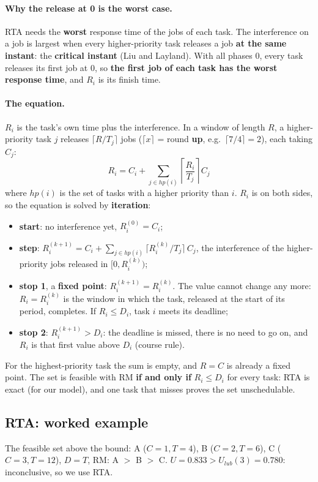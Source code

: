 \paragraph{Why the release at 0 is the worst case.} RTA needs the \textbf{worst} response time of the jobs of each task. The interference on a job is largest when every higher-priority task releases a job \textbf{at the same instant}: the \textbf{critical instant} (Liu and Layland). With all phases 0, every task releases its first job at 0, so \textbf{the first job of each task has the worst response time}, and $R_i$ is its finish time.

\paragraph{The equation.} $R_i$ is the task's own time plus the interference. In a window of length $R$, a higher-priority task $j$ releases $\lceil R / T_j \rceil$ jobs ($\lceil x \rceil$ = round \textbf{up}, e.g.\ $\lceil 7/4 \rceil = 2$), each taking $C_j$:
\[
R_i = C_i + \sum_{j \in hp(i)} \left\lceil \frac{R_i}{T_j} \right\rceil C_j
\]
where $hp(i)$ is the set of tasks with a higher priority than $i$. $R_i$ is on both sides, so the equation is solved by \textbf{iteration}:
\begin{itemize}
    \item \textbf{start}: no interference yet, $R_i^{(0)} = C_i$;
    \item \textbf{step}: $R_i^{(k+1)} = C_i + \sum_{j \in hp(i)} \lceil R_i^{(k)} / T_j \rceil \, C_j$, the interference of the higher-priority jobs released in $[0, R_i^{(k)})$;
    \item \textbf{stop 1}, a \textbf{fixed point}: $R_i^{(k+1)} = R_i^{(k)}$. The value cannot change any more: $R_i = R_i^{(k)}$ is the window in which the task, released at the start of its period, completes. If $R_i \le D_i$, task $i$ meets its deadline;
    \item \textbf{stop 2}: $R_i^{(k+1)} > D_i$: the deadline is missed, there is no need to go on, and $R_i$ is that first value above $D_i$ (course rule).
\end{itemize}
For the highest-priority task the sum is empty, and $R = C$ is already a fixed point. The set is feasible with RM \textbf{if and only if} $R_i \le D_i$ for every task: RTA is exact (for our model), and one task that misses proves the set unschedulable.

\subsection{RTA: worked example}
The feasible set above the bound: A ($C = 1, T = 4$), B ($C = 2, T = 6$), C ($C = 3, T = 12$), $D = T$, RM: A $>$ B $>$ C. $U = 0.833 > U_{lub}(3) = 0.780$: inconclusive, so we use RTA.

